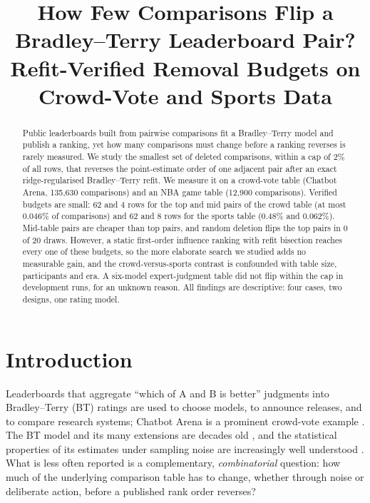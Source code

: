 \documentclass{article}
\title{How Few Comparisons Flip a Bradley--Terry Leaderboard Pair? Refit-Verified Removal Budgets on Crowd-Vote and Sports Data}
\author{}
\begin{document}
\maketitle

\begin{abstract}
Public leaderboards built from pairwise comparisons fit a Bradley--Terry model and publish a ranking, yet how many comparisons must change before a ranking reverses is rarely measured. We study the smallest set of deleted comparisons, within a cap of 2\% of all rows, that reverses the point-estimate order of one adjacent pair after an exact ridge-regularised Bradley--Terry refit. We measure it on a crowd-vote table (Chatbot Arena, 135,630 comparisons) and an NBA game table (12,900 comparisons). Verified budgets are small: 62 and 4 rows for the top and mid pairs of the crowd table (at most 0.046\% of comparisons) and 62 and 8 rows for the sports table (0.48\% and 0.062\%). Mid-table pairs are cheaper than top pairs, and random deletion flips the top pairs in 0 of 20 draws. However, a static first-order influence ranking with refit bisection reaches every one of these budgets, so the more elaborate search we studied adds no measurable gain, and the crowd-versus-sports contrast is confounded with table size, participants and era. A six-model expert-judgment table did not flip within the cap in development runs, for an unknown reason. All findings are descriptive: four cases, two designs, one rating model.
\end{abstract}

\section{Introduction}
Leaderboards that aggregate ``which of A and B is better'' judgments into Bradley--Terry (BT) ratings are used to choose models, to announce releases, and to compare research systems; Chatbot Arena is a prominent crowd-vote example \citep{https://doi.org/10.48550/arxiv.2403.04132}. The BT model and its many extensions are decades old \citep{Davidson1970OnET,Davidson1969MultivariatePC,Leonard1977AnAB}, and the statistical properties of its estimates under sampling noise are increasingly well understood \citep{Simons1999AsymptoticsWT,Gao2021UncertaintyQI,Li2021ThePO}. What is less often reported is a complementary, \emph{combinatorial} question: how much of the underlying comparison table has to change, whether through noise or deliberate action, before a published rank order reverses?
\end{document}
